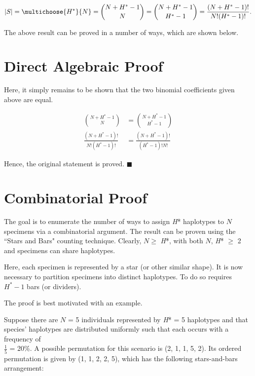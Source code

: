 \begin{equation}
|S| = \multichoose{H^*}{N} = {{N + H^* - 1}\choose{N}} = {{N + H^* - 1}\choose{H^* - 1}} = \frac{(N + H^* - 1)!}{N!(H^* - 1)!}.
\end{equation}

\noindent The above result can be proved in a number of ways, which are shown below.

\section{Direct Algebraic Proof}

Here, it simply remains to be shown that the two binomial coefficients given above are equal. 

\vspace{5mm}

\begin{align*}
\binom{N + H^* - 1}{N} &= \binom{N + H^* - 1}{H^* - 1} \\
\frac{(N + H^* - 1)!}{N!(H^* - 1)!} &= \frac{(N + H^* - 1)!}{(H^* - 1)!N!}  
\end{align*} 

Hence, the original statement is proved. $\blacksquare$ 



\section{Combinatorial Proof}

The goal is to enumerate the number of ways to assign \textit{H}* haplotypes to $N$ specimens via a combinatorial argument. The result can be proven using the ``Stars and Bars" counting technique. Clearly, $N \geq$ \textit{H}*, with both $N$, \textit{H}* $\geq$ 2 and specimens can share haplotypes.

\vspace{5mm} 

Here, each specimen is represented by a star (or other similar shape). It is now necessary to partition specimens into distinct haplotypes. To do so requires $H^* - 1$ bars (or dividers). 

\vspace{5mm}

The proof is best motivated with an example.

\vspace{5mm}

Suppose there are $N$ = 5 individuals represented by \textit{H}* = 5 haplotypes and that species' haplotypes are distributed uniformly such that each occurs with a frequency of \\ $\frac{1}{5}$ = 20\%. A possible permutation for this scenario is (2, 1, 1, 5, 2). Its ordered permutation is given by (1, 1, 2, 2, 5), which has the following stars-and-bars arrangement:


